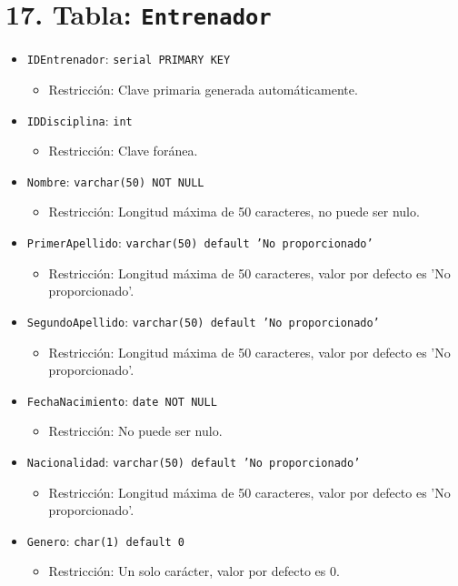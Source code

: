 \section*{17. Tabla: \texttt{Entrenador}}
\begin{itemize}
    \item \texttt{IDEntrenador}: \texttt{serial PRIMARY KEY}
    \begin{itemize}
        \item Restricción: Clave primaria generada automáticamente.
    \end{itemize}
    \item \texttt{IDDisciplina}: \texttt{int}
    \begin{itemize}
        \item Restricción: Clave foránea.
    \end{itemize}
    \item \texttt{Nombre}: \texttt{varchar(50) NOT NULL}
    \begin{itemize}
        \item Restricción: Longitud máxima de 50 caracteres, no puede ser nulo.
    \end{itemize}
    \item \texttt{PrimerApellido}: \texttt{varchar(50) default 'No proporcionado'}
    \begin{itemize}
        \item Restricción: Longitud máxima de 50 caracteres, valor por defecto es 'No proporcionado'.
    \end{itemize}
    \item \texttt{SegundoApellido}: \texttt{varchar(50) default 'No proporcionado'}
    \begin{itemize}
        \item Restricción: Longitud máxima de 50 caracteres, valor por defecto es 'No proporcionado'.
    \end{itemize}
    \item \texttt{FechaNacimiento}: \texttt{date NOT NULL}
    \begin{itemize}
        \item Restricción: No puede ser nulo.
    \end{itemize}
    \item \texttt{Nacionalidad}: \texttt{varchar(50) default 'No proporcionado'}
    \begin{itemize}
        \item Restricción: Longitud máxima de 50 caracteres, valor por defecto es 'No proporcionado'.
    \end{itemize}
    \item \texttt{Genero}: \texttt{char(1) default 0}
    \begin{itemize}
        \item Restricción: Un solo carácter, valor por defecto es 0.
    \end{itemize}
\end{itemize}

